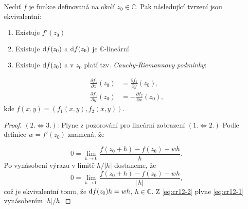 
\begin{theorem}\label{CR}
Nechť $f$ je funkce definovaná na okolí $z_0 \in \mathbb{C}$. Pak následující tvrzení jsou ekvivalentní:
\begin{enumerate}
    \item Existuje $f'(z_0)$ %
    \item Existuje $\mathop{}\!\mathrm{d} f(z_0)$ a $\mathop{}\!\mathrm{d} f(z_0)$ je $ \mathbb{C}$-lineární %
    \item Existuje $\mathop{}\!\mathrm{d} f(z_0)$ a v $z_0$ platí tzv. \emph{Cauchy-Riemannovy podmínky}: %
\end{enumerate}
\begin{align*}
\tag{CR}
\label{eqn:CR}
\frac{\partial f_1}{\partial x}(z_0) &= \frac{\partial f_2}{\partial y}(z_0)\text{, }\\
\frac{\partial f_1}{\partial y}(z_0) &= -\frac{\partial f_2}{\partial x}(z_0)\text{,}    
\end{align*}
kde $f(x,y) = (f_1(x,y),f_2(x,y))$.

\end{theorem}
\begin{proof}
$(2. \iff 3.)$: Plyne z pozorování pro lineární zobrazení %
\newline
$(1. \iff 2.)$ Podle definice $w = f'(z_0)$ znamená, že 

\begin{equation}\label{eq:cr12-1} 
0 = \lim_{h \to 0} {\frac{f(z_0+h)-f(z_0)-wh}{h}}\text{.} 
\end{equation}
Po vynásobení výrazu v limitě $h/|h|$ dostaneme, že
\begin{equation}\label{eq:cr12-2}
0 = \lim_{h \to 0} \frac{f(z_0+h)-f(z_0)-wh}{|h|}\text{,}
\end{equation}%
což je ekvivalentní tomu, že  $\mathop{}\!\mathrm{d} f(z_0)h=wh$, $h\in \mathbb{C}$. Z \cref{eq:cr12-2} plyne \cref{eq:cr12-1} vynásobením $|h|/h$.
\end{proof}

